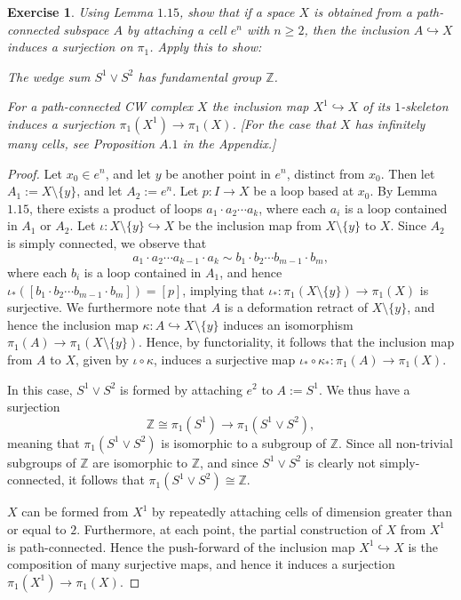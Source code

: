 \documentclass{article}
\newtheorem{exercise}{Exercise}[subsection]
\begin{document}
\begin{exercise}
Using Lemma $1.15$, show that if a space $X$ is obtained from a path-connected subspace $A$ by attaching a cell $e^n$ with $n\geq 2$, then the inclusion $A\hookrightarrow X$ induces a surjection on $\pi_1$. Apply this to show:
\item[(a)] The wedge sum $S^1\vee S^2$ has fundamental group $\mathbb{Z}$.
\item[(b)] For a path-connected CW complex $X$ the inclusion map $X^1\hookrightarrow X$ of its $1$-skeleton induces a surjection $\pi_1(X^1)\to\pi_1(X)$. [For the case that $X$  has infinitely many cells, see Proposition $A.1$ in the Appendix.]
\end{exercise}
\begin{proof}
Let $x_0\in e^n$, and let $y$ be another point in $e^n$, distinct from $x_0$. Then let $A_1:=X\setminus\{y\}$, and let $A_2:= e^n$. Let $p:I\to X$ be a loop based at $x_0$. By Lemma $1.15$, there exists a product of loops $a_1\cdot a_2\cdots a_k$, where each $a_i$ is a loop contained in $A_1$ or $A_2$. Let $\iota:X\setminus\{y\}\hookrightarrow X$ be the inclusion map from $X\setminus\{y\}$ to $X$. Since $A_2$ is simply connected, we observe that \[a_1\cdot a_2\cdots a_{k-1}\cdot a_k\sim b_1\cdot b_2 \cdots b_{m-1}\cdot b_m,\] where each $b_i$ is a loop contained in $A_1$, and hence $\iota_*([b_1\cdot b_2 \cdots b_{m-1}\cdot b_m])=[p]$, implying that $\iota_*:\pi_1(X\setminus\{y\})\to \pi_1(X)$ is surjective. We furthermore note that $A$ is a deformation retract of $X\setminus\{y\}$, and hence the inclusion map $\kappa:A\hookrightarrow X\setminus\{y\}$ induces an isomorphism $\pi_1(A)\to\pi_1(X\setminus\{y\})$. Hence, by functoriality, it follows that the inclusion map from $A$ to $X$, given by $\iota\circ\kappa$, induces a surjective map $\iota_*\circ\kappa_*:\pi_1(A)\to\pi_1(X)$.
\item[(a)] In this case, $S^1\vee S^2$ is formed by attaching $e^2$ to $A:=S^1$. We thus have a surjection \[\mathbb{Z}\cong\pi_1(S^1)\to \pi_1(S^1\vee S^2),\] meaning that $\pi_1(S^1\vee S^2)$ is isomorphic to a subgroup of $\mathbb{Z}$. Since all non-trivial subgroups of $\mathbb{Z}$ are isomorphic to $\mathbb{Z}$, and since $S^1\vee S^2$ is clearly not simply-connected, it follows that $\pi_1(S^1\vee S^2)\cong\mathbb{Z}$.
\item[(b)] $X$ can be formed from $X^1$ by repeatedly attaching cells of dimension greater than or equal to $2$. Furthermore, at each point, the partial construction of $X$ from $X^1$ is path-connected. Hence the push-forward of the inclusion map $X^1\hookrightarrow X$ is the composition of many surjective maps, and hence it induces a surjection $\pi_1(X^1)\to\pi_1(X)$.
\end{proof}
\end{document}
